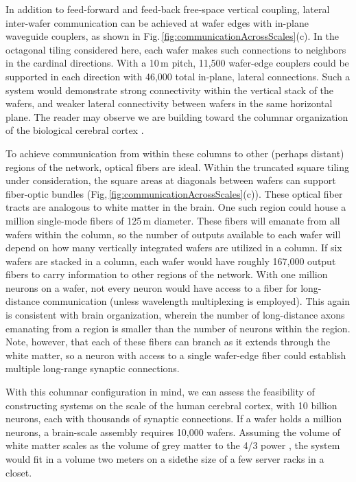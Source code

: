 \documentclass[twocolumn]{article}
\begin{document}
In addition to feed-forward and feed-back free-space vertical coupling, lateral inter-wafer communication can be achieved at wafer edges with in-plane waveguide couplers, as shown in Fig.\,\ref{fig:communicationAcrossScales}(c). In the octagonal tiling considered here, each wafer makes such connections to neighbors in the cardinal directions. With a 10\,\textmu m pitch, 11,500 wafer-edge couplers could be supported in each direction with 46,000 total in-plane, lateral connections. Such a system would demonstrate strong connectivity within the vertical stack of the wafers, and weaker lateral connectivity between wafers in the same horizontal plane. The reader may observe we are building toward the columnar organization of the biological cerebral cortex \cite{mo1997}.

To achieve communication from within these columns to other (perhaps distant) regions of the network, optical fibers are ideal. Within the truncated square tiling under consideration, the square areas at diagonals between wafers can support fiber-optic bundles (Fig,\,\ref{fig:communicationAcrossScales}(c)). These optical fiber tracts are analogous to white matter in the brain. One such region could house a million single-mode fibers of 125\,\textmu m diameter. These fibers will emanate from all wafers within the column, so the number of outputs available to each wafer will depend on how many vertically integrated wafers are utilized in a column. If six wafers are stacked in a column, each wafer would have roughly 167,000 output fibers to carry information to other regions of the network. With one million neurons on a wafer, not every neuron would have access to a fiber for long-distance communication (unless wavelength multiplexing is employed). This again is consistent with brain organization, wherein the number of long-distance axons emanating from a region is smaller than the number of neurons within the region. Note, however, that each of these fibers can branch as it extends through the white matter, so a neuron with access to a single wafer-edge fiber could establish multiple long-range synaptic connections. 

With this columnar configuration in mind, we can assess the feasibility of constructing systems on the scale of the human cerebral cortex, with 10 billion neurons, each with thousands of synaptic connections. If a wafer holds a million neurons, a brain-scale assembly requires 10,000 wafers. Assuming the volume of white matter scales as the volume of grey matter to the 4/3 power \cite{zhse2000}, the system would fit in a volume two meters on a side\textemdash the size of a few server racks in a closet. 
\end{document}
